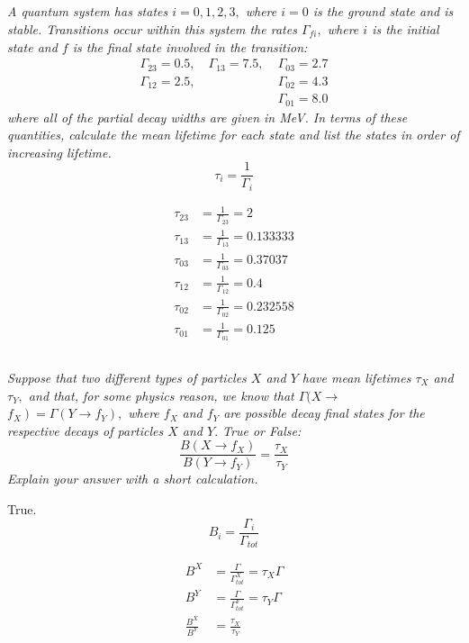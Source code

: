 \documentclass{article}
\begin{document}
\subsection{}
\textit{A quantum system has states $i=0,1,2,3,$ where $i=0$ is the ground state and is stable. Transitions occur within this system the rates $\Gamma_{f i},$ where $i$ is the initial state and $f$ is the final state involved in the transition:
$$
\begin{aligned}
\Gamma_{23}=0.5, \quad \Gamma_{13}=7.5, \;& \Gamma_{03}=2.7 \\
\Gamma_{12}=2.5, \; & \Gamma_{02}=4.3 \\
&\Gamma_{01}= 8.0
\end{aligned}
$$
where all of the partial decay widths are given in MeV. In terms of these quantities, calculate the mean lifetime for each state and list the states in order of increasing lifetime.}
$$ \tau_i = \frac{1}{\Gamma_{i}}$$

\begin{align*}
    \tau_{23} &= \frac{1}{\Gamma_{23}} = 2 \\
    \tau_{13} &= \frac{1}{\Gamma_{13}} =0.133333 \\
    \tau_{03} &= \frac{1}{\Gamma_{03}} = 0.37037\\
    \tau_{12} &= \frac{1}{\Gamma_{12}} = 0.4 \\
    \tau_{02} &= \frac{1}{\Gamma_{02}} = 0.232558\\
    \tau_{01} &= \frac{1}{\Gamma_{01}} = 0.125
\end{align*}



\subsection{}
\textit{Suppose that two different types of particles $X$ and $Y$ have mean lifetimes $\tau_{X}$ and $\tau_{Y},$ and that, for some physics reason, we know that $\Gamma(X \rightarrow$ $\left.f_{X}\right)=\Gamma\left(Y \rightarrow f_{Y}\right),$ where $f_{X}$ and $f_{Y}$ are possible decay final states for the respective decays of particles $X$ and $Y .$ True or False:
$$
\frac{B\left(X \rightarrow f_{X}\right)}{B\left(Y \rightarrow f_{Y}\right)}=\frac{\tau_{X}}{\tau_{Y}}
$$
Explain your answer with a short calculation.}

True.
$$ B_i = \frac{\Gamma_i}{\Gamma_{tot}} $$

\begin{align*}
    B^X &= \frac{\Gamma}{\Gamma_{tot}^X} = \tau_X \Gamma \\
    B^Y &= \frac{\Gamma}{\Gamma_{tot}^Y} = \tau_Y \Gamma \\
    \frac{B^X}{B^Y}& = \frac{\tau_X}{\tau_Y}
\end{align*}
\end{document}

